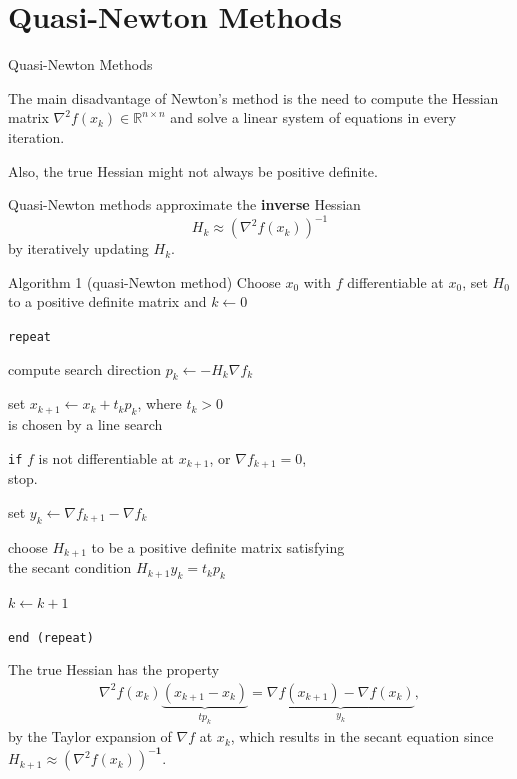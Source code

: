 \documentclass{beamer}
\begin{document}
\section{Quasi-Newton Methods}
\begin{frame}{Quasi-Newton Methods}
     {
        The main disadvantage of Newton's method
        is the need to compute
        the Hessian matrix $\nabla^2 f(x_k) \in \mathbb{R}^{n \times n}$
        and solve a linear system of equations
        in every iteration.

        \vspace{0.5em}
        Also, the true Hessian might not always be positive definite.
    }

     {
        Quasi-Newton methods approximate the
        \textbf{inverse} Hessian
        $$H_k \approx (\nabla^2 f(x_k))^{-1}$$
        by iteratively updating $H_k$.
    }

     {
        \begin{block}{Algorithm 1 (quasi-Newton method)}
            Choose $x_0$ with $f$ differentiable at $x_0$,
            set $H_0$ to a positive definite matrix and
            $k \leftarrow 0$

            \texttt{repeat}

            \qquad compute search direction $p_k \leftarrow -H_k \nabla f_k$

            \qquad set $x_{k + 1} \leftarrow x_k + t_k p_k$,
            where $t_k > 0$ \\
            \qquad\qquad is chosen by a line search

            \qquad \texttt{if} $f$ is not differentiable at $x_{k + 1}$,
            or $\nabla f_{k + 1} = 0$, \\
            \qquad\qquad stop.

            \qquad set $y_k \leftarrow \nabla f_{k + 1} - \nabla f_k$

            \qquad choose $H_{k + 1}$ to be a positive definite matrix
            satisfying \\
            \qquad\qquad the secant condition $H_{k + 1} y_k = t_k p_k$

            \qquad $k \leftarrow k + 1$

            \texttt{end (repeat)}
        \end{block}
    }

     {
        The true Hessian has the property
        \begin{align*}
            \nabla^2 f(x_{k}) \underbrace{
                (x_{k + 1} - x_k)
            }_{t p_k} =
            \underbrace{
                \nabla f(x_{k + 1}) - \nabla f(x_k)
            }_{y_k},
        \end{align*}
        by the Taylor expansion of $\nabla f$ at $x_k$,
        which results in the secant equation since
        $H_{k + 1} \approx (\nabla^2 f(x_k))^{\mathbf{-1}}$.
    }


\end{frame}
\end{document}
